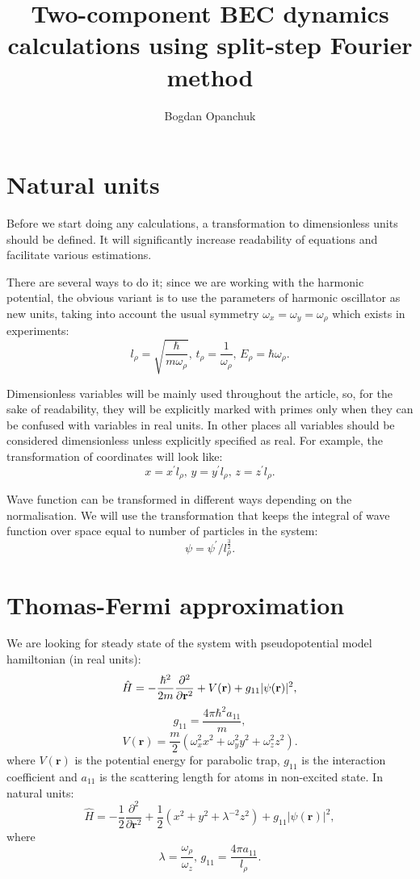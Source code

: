 \documentclass[12pt,notitlepage]{report}
\title{Two-component BEC dynamics calculations using split-step Fourier method}
\author{Bogdan Opanchuk}
\begin{document}
\maketitle

\section*{Natural units}

Before we start doing any calculations, a transformation to dimensionless units should be defined. It will significantly increase readability of equations and facilitate various estimations.

There are several ways to do it; since we are working with the harmonic potential, the obvious variant is to use the parameters of harmonic oscillator as new units, taking into account the usual symmetry $\omega_x = \omega_y = \omega_\rho$ which exists in experiments:
\[ l_\rho =  \sqrt{\frac{\hbar}{m\omega_\rho}},\, t_\rho = \frac{1}{\omega_\rho},\, E_\rho = \hbar \omega_\rho. \]

Dimensionless variables will be mainly used throughout the article, so, for the sake of readability, they will be explicitly marked with primes only when they can be confused with variables in real units. In other places all variables should be considered dimensionless unless explicitly specified as real. For example, the transformation of coordinates will look like:
\[ x = x^\prime l_\rho,\, y = y^\prime l_\rho,\, z = z^\prime l_\rho. \]

Wave function can be transformed in different ways depending on the normalisation. We will use the transformation that keeps the integral of wave function over space equal to number of particles in the system:
\[ \psi = \psi^\prime / l_\rho^\frac{3}{2}. \]

\section*{Thomas-Fermi approximation}

We are looking for steady state of the system with pseudopotential model hamiltonian (in real units):
\[ 
\hat{H} = -\frac{\hbar^2}{2m} \frac{\partial^2}{\partial \mathbf{r}^2} + \\
V(\mathbf{r}) + g_{11} \vert \psi(\mathbf{r}) \vert^2,
\]
\[ g_{11} = \frac{4 \pi \hbar^2 a_{11}}{m}, \]
\[ V(\mathbf{r}) = \frac{m}{2} \left( \omega_x^2 x^2 + \omega_y^2 y^2 + \omega_z^2 z^2 \right). \]
where $V(\mathbf{r})$ is the potential energy for parabolic trap, $g_{11}$ is the interaction coefficient and $a_{11}$ is the scattering length for atoms in non-excited state. In natural units:
\[
\hat{H} = -\frac{1}{2} \frac{\partial^2}{\partial \mathbf{r}^2} + 
\frac{1}{2} \left( x^2 + y^2 + \lambda^{-2} z^2 \right) + g_{11} \vert \psi(\mathbf{r}) \vert^2,
\]
where
\[ \lambda = \frac{\omega_\rho}{\omega_z},\, g_{11} = \frac{4 \pi a_{11}}{l_\rho}. \]
\end{document}
